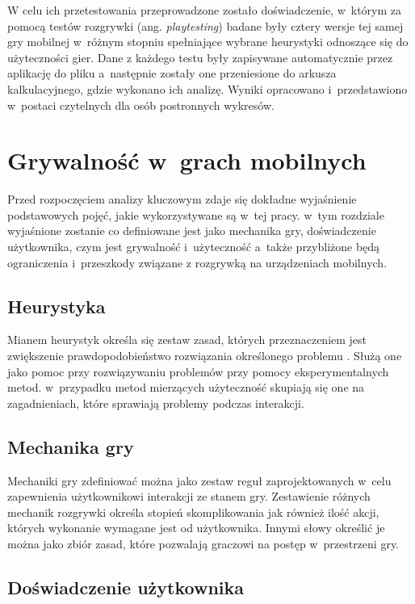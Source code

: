 \documentclass[a4paper,12pt,numbers=noenddot]{report}
\begin{document}
W celu ich przetestowania przeprowadzone zostało doświadczenie, w~którym za pomocą testów rozgrywki (ang. \textit{playtesting}) badane były cztery wersje tej samej gry mobilnej w~różnym stopniu spełniające wybrane heurystyki odnoszące się do użyteczności gier. Dane z każdego testu były zapisywane automatycznie przez aplikację do pliku a~następnie zostały one przeniesione do arkusza kalkulacyjnego, gdzie wykonano ich analizę. Wyniki opracowano i~przedstawiono w~postaci czytelnych dla osób postronnych wykresów.


\chapter{Grywalność w~grach mobilnych}
Przed rozpoczęciem analizy kluczowym zdaje się dokładne wyjaśnienie podstawowych pojęć, jakie wykorzystywane są w~tej pracy. w~tym rozdziale wyjaśnione zostanie co definiowane jest jako mechanika gry, doświadczenie użytkownika, czym jest grywalność i~użyteczność a~także przybliżone będą ograniczenia i~przeszkody związane z rozgrywką na urządzeniach mobilnych.

\section{Heurystyka}
Mianem heurystyk określa się zestaw zasad, których przeznaczeniem jest zwiększenie prawdopodobieństwo rozwiązania określonego problemu \cite{art_WithHeuristic}. Służą one jako pomoc przy rozwiązywaniu problemów przy pomocy eksperymentalnych metod. w~przypadku metod mierzących użyteczność skupiają się one na zagadnieniach, które sprawiają problemy podczas interakcji\cite{art_Nielsen}\cite{art_evaluatingPlayabilityMG}. 

\section{Mechanika gry}
Mechaniki gry zdefiniować można jako zestaw reguł zaprojektowanych w~celu zapewnienia użytkownikowi interakcji ze stanem gry. Zestawienie różnych mechanik rozgrywki określa stopień skomplikowania jak również ilość akcji, których wykonanie wymagane jest od użytkownika. Innymi słowy określić je można jako zbiór zasad, które pozwalają graczowi na postęp w~przestrzeni gry. \cite{online_GameMechanics}

\section{Doświadczenie użytkownika}
\end{document}

